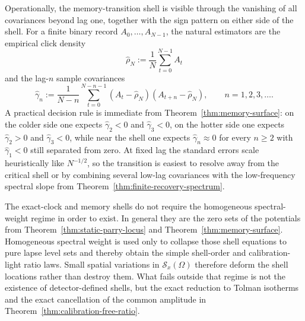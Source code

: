 \begin{remark}\label{rem:memory-shell-detection}
Operationally, the memory-transition shell is visible through the vanishing of all covariances beyond lag one, together with the sign pattern on either side of the shell. For a finite binary record $A_0,\dots,A_{N-1}$, the natural estimators are the empirical click density
\[
\widehat\rho_N:=\frac{1}{N}\sum_{t=0}^{N-1}A_t
\]
and the lag-$n$ sample covariances
\[
\widehat\gamma_n
:=
\frac{1}{N-n}\sum_{t=0}^{N-n-1}(A_t-\widehat\rho_N)(A_{t+n}-\widehat\rho_N),
\qquad n=1,2,3,\dots.
\]
A practical decision rule is immediate from Theorem~\ref{thm:memory-surface}: on the colder side one expects $\widehat\gamma_2<0$ and $\widehat\gamma_3<0$, on the hotter side one expects $\widehat\gamma_2>0$ and $\widehat\gamma_3<0$, while near the shell one expects $\widehat\gamma_n\approx 0$ for every $n\ge 2$ with $\widehat\gamma_1<0$ still separated from zero. At fixed lag the standard errors scale heuristically like $N^{-1/2}$, so the transition is easiest to resolve away from the critical shell or by combining several low-lag covariances with the low-frequency spectral slope from Theorem~\ref{thm:finite-recovery-spectrum}.
\end{remark}

\begin{remark}\label{rem:beyond-homogeneous-spectral-weight}
The exact-clock and memory shells do not require the homogeneous spectral-weight regime in order to exist. In general they are the zero sets of the potentials from Theorem~\ref{thm:static-parry-locus} and Theorem~\ref{thm:memory-surface}. Homogeneous spectral weight is used only to collapse those shell equations to pure lapse level sets and thereby obtain the simple shell-order and calibration-light ratio laws. Small spatial variations in $\mathcal S_x(\Omega)$ therefore deform the shell locations rather than destroy them. What fails outside that regime is not the existence of detector-defined shells, but the exact reduction to Tolman isotherms and the exact cancellation of the common amplitude in Theorem~\ref{thm:calibration-free-ratio}.
\end{remark}

